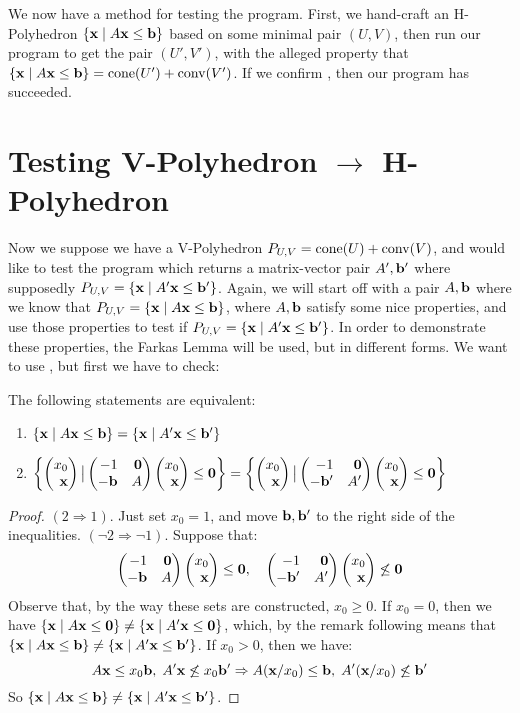 \begin{Test}\label{test_hp_to_vp}
	We now have a method for testing the program.  First, we hand-craft an H-Polyhedron $\left\{\mathbf{x}\;|\; A\mathbf{x}\leq \mathbf{b}\right\}$ based on some minimal pair $(U,V)$, then run our program to get the pair $(U',V')$, with the alleged property that $\left\{\mathbf{x}\;|\; A\mathbf{x}\leq \mathbf{b}\right\} = \operatorname{cone}(U') + \operatorname{conv}(V')$.  If we confirm , then our program has succeeded.
\end{Test}

\section{Testing V-Polyhedron $\to$ H-Polyhedron}
Now we suppose we have a V-Polyhedron $P_{U,V} = \operatorname{cone}(U) + \operatorname{conv}(V)$, and would like to test the program which returns a matrix-vector pair $A',\mathbf{b}'$ where supposedly $P_{U,V} = \left\{\mathbf{x}\;|\; A'\mathbf{x}\leq \mathbf{b}'\right\}$.  Again, we will start off with a pair $A,\mathbf{b}$ where we know that $P_{U,V} = \left\{\mathbf{x}\;|\; A\mathbf{x}\leq \mathbf{b}\right\}$, where $A,\mathbf{b}$ satisfy some nice properties, and use those properties to test if $P_{U,V} = \left\{\mathbf{x}\;|\; A'\mathbf{x}\leq \mathbf{b}'\right\}$.  In order to demonstrate these properties, the Farkas Lemma will be used, but in different forms.  We want to use , but first we have to check:

\begin{Prop}\label{homogenization_cone}
	The following statements are equivalent:
	\begin{enumerate}
		\item $\left\{\mathbf{x}\;|\; A\mathbf{x}\leq \mathbf{b}\right\} = \left\{\mathbf{x}\;|\; A'\mathbf{x}\leq \mathbf{b}'\right\}$
		\item $\set{\xx \big| \pmb -1 & \0 \\ -\b & A \pme \xx \leq \0} =
			      \set{\xx \big| \pmb -1 & \0 \\ -\b' & A' \pme \xx \leq \0}$
	\end{enumerate}
\end{Prop}

\begin{proof}
	$(2 \Rightarrow 1)$.  Just set $x_0 = 1$, and move $\mathbf{b},\mathbf{b}'$ to the right side of the inequalities.
	$(\neg 2 \Rightarrow \neg 1)$.  Suppose that:
	\[ \pmb -1 & \0 \\ -\b & A \pme \xx \leq \0,\quad
		\pmb -1 & \0 \\ -\b' & A' \pme \xx \not\leq \0 \]
	Observe that, by the way these sets are constructed, $x_0 \geq 0$.  If $x_0 = 0$, then we have $\left\{\mathbf{x}\;|\; A\mathbf{x}\leq\mathbf{0}\right\} \neq \left\{\mathbf{x}\;|\; A'\mathbf{x}\leq\mathbf{0}\right\}$, which, by the remark following  means that $\left\{\mathbf{x}\;|\; A\mathbf{x}\leq \mathbf{b}\right\} \neq \left\{\mathbf{x}\;|\; A'\mathbf{x}\leq \mathbf{b}'\right\}$.  If $x_0 > 0$, then we have:
	\[ A\mathbf{x} \leq x_0\mathbf{b},\;A'\mathbf{x}\not\leq x_0\mathbf{b}' \Rightarrow A(\mathbf{x}/x_0)\leq\mathbf{b},\;A'(\mathbf{x}/x_0)\not\leq\mathbf{b}' \]
	So $\left\{\mathbf{x}\;|\; A\mathbf{x}\leq \mathbf{b}\right\} \neq \left\{\mathbf{x}\;|\; A'\mathbf{x}\leq \mathbf{b}'\right\}$.
\end{proof}

